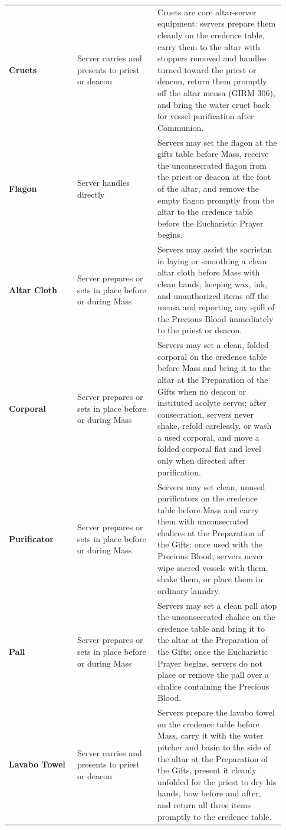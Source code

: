 {\begin{longtable}{>{\raggedright\arraybackslash}p{0.23\linewidth}>{\raggedright\arraybackslash}p{0.27\linewidth}>{\raggedright\arraybackslash}p{0.43\linewidth}}
\textbf{Cruets} & Server carries and presents to priest or deacon & Cruets are core altar-server equipment: servers prepare them cleanly on the credence table, carry them to the altar with stoppers removed and handles turned toward the priest or deacon, return them promptly off the altar mensa (GIRM 306), and bring the water cruet back for vessel purification after Communion. \\
\textbf{Flagon} & Server handles directly & Servers may set the flagon at the gifts table before Mass, receive the unconsecrated flagon from the priest or deacon at the foot of the altar, and remove the empty flagon promptly from the altar to the credence table before the Eucharistic Prayer begins. \\
\textbf{Altar Cloth} & Server prepares or sets in place before or during Mass & Servers may assist the sacristan in laying or smoothing a clean altar cloth before Mass with clean hands, keeping wax, ink, and unauthorized items off the mensa and reporting any spill of the Precious Blood immediately to the priest or deacon. \\
\textbf{Corporal} & Server prepares or sets in place before or during Mass & Servers may set a clean, folded corporal on the credence table before Mass and bring it to the altar at the Preparation of the Gifts when no deacon or instituted acolyte serves; after consecration, servers never shake, refold carelessly, or wash a used corporal, and move a folded corporal flat and level only when directed after purification. \\
\textbf{Purificator} & Server prepares or sets in place before or during Mass & Servers may set clean, unused purificators on the credence table before Mass and carry them with unconsecrated chalices at the Preparation of the Gifts; once used with the Precious Blood, servers never wipe sacred vessels with them, shake them, or place them in ordinary laundry. \\
\textbf{Pall} & Server prepares or sets in place before or during Mass & Servers may set a clean pall atop the unconsecrated chalice on the credence table and bring it to the altar at the Preparation of the Gifts; once the Eucharistic Prayer begins, servers do not place or remove the pall over a chalice containing the Precious Blood. \\
\textbf{Lavabo Towel} & Server carries and presents to priest or deacon & Servers prepare the lavabo towel on the credence table before Mass, carry it with the water pitcher and basin to the side of the altar at the Preparation of the Gifts, present it cleanly unfolded for the priest to dry his hands, bow before and after, and return all three items promptly to the credence table. \\

\end{longtable}}
